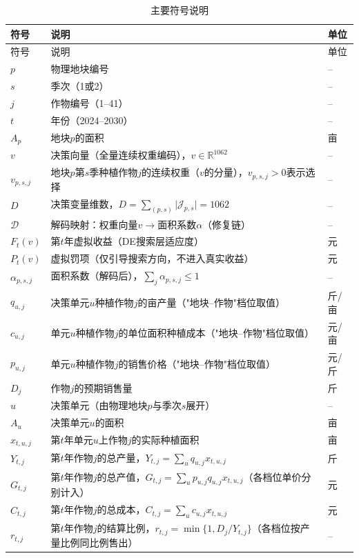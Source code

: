 \documentclass[12pt,a4paper]{article}
\begin{document}
\begin{longtable}{p{3cm}p{8cm}p{2cm}}
\caption{主要符号说明}\label{tab:symbol}\\
\toprule
符号 & 说明 & 单位\\
\midrule
\endfirsthead
\toprule
符号 & 说明 & 单位\\
\midrule
\endhead
\bottomrule
\endlastfoot
$p$ & 物理地块编号 & --\\
$s$ & 季次（1或2） & --\\
$j$ & 作物编号（1--41） & --\\
$t$ & 年份（2024--2030） & --\\
$A_p$ & 地块$p$的面积 & 亩\\
$v$ & 决策向量（全量连续权重编码），$v\in\mathbb{R}^{1062}$ & --\\
$v_{p,s,j}$ & 地块$p$第$s$季种植作物$j$的连续权重（$v$的分量），$v_{p,s,j}>0$表示选择 & --\\
$D$ & 决策变量维数，$D=\sum_{(p,s)}\lvert\mathcal{J}_{p,s}\rvert=1062$ & --\\
$\mathcal{D}$ & 解码映射：权重向量$v\to$面积系数$\alpha$（修复链） & --\\
$F_t(v)$ & 第$t$年虚拟收益（DE搜索层适应度） & 元\\
$P_t(v)$ & 虚拟罚项（仅引导搜索方向，不进入真实收益） & 元\\
$\alpha_{p,s,j}$ & 面积系数（解码后），$\sum_j\alpha_{p,s,j}\le1$ & --\\
$q_{u,j}$ & 决策单元$u$种植作物$j$的亩产量（"地块--作物"档位取值） & 斤/亩\\
$c_{u,j}$ & 单元$u$种植作物$j$的单位面积种植成本（"地块--作物"档位取值） & 元/亩\\
$p_{u,j}$ & 单元$u$种植作物$j$的销售价格（"地块--作物"档位取值） & 元/斤\\
$D_j$ & 作物$j$的预期销售量 & 斤\\
$u$ & 决策单元（由物理地块$p$与季次$s$展开） & --\\
$A_u$ & 决策单元$u$的面积 & 亩\\
$x_{t,u,j}$ & 第$t$年单元$u$上作物$j$的实际种植面积 & 亩\\
$Y_{t,j}$ & 第$t$年作物$j$的总产量，$Y_{t,j}=\sum_{u}q_{u,j}x_{t,u,j}$ & 斤\\
$G_{t,j}$ & 第$t$年作物$j$的总产值，$G_{t,j}=\sum_{u}p_{u,j}q_{u,j}x_{t,u,j}$（各档位单价分别计入） & 元\\
$C_{t,j}$ & 第$t$年作物$j$的总成本，$C_{t,j}=\sum_{u}c_{u,j}x_{t,u,j}$ & 元\\
$r_{t,j}$ & 第$t$年作物$j$的结算比例，$r_{t,j}=\min\{1,D_j/Y_{t,j}\}$（各档位按产量比例同比例售出） & --\\

\end{longtable}
\end{document}
